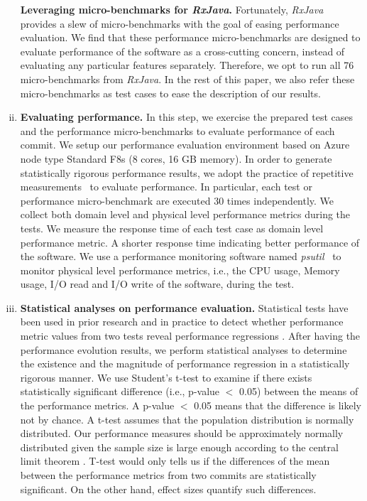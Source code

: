 \begin{enumerate}[(i)]
\noindent \textbf{Leveraging micro-benchmarks for \emph{RxJava}. }Fortunately, \emph{RxJava} provides a slew of micro-benchmarks with the goal of easing performance evaluation. We find that these performance micro-benchmarks are designed to evaluate performance of the software as a cross-cutting concern, instead of evaluating any particular features separately. Therefore, we opt to run all 76 micro-benchmarks from \emph{RxJava}. In the rest of this paper, we also refer these micro-benchmarks as test cases to ease the description of our results.

\item \textbf{Evaluating performance.}
In this step, we exercise the prepared test cases and the performance micro-benchmarks to evaluate performance of each commit. We setup our performance evaluation environment based on Azure node type Standard F8s (8 cores, 16 GB memory). In order to generate statistically rigorous performance results, we adopt the practice of repetitive measurements~\cite{peterfse} to evaluate performance. 
In particular, each test or performance micro-benchmark are executed 30 times independently. We collect both domain level and physical level performance metrics during the tests. We measure the response time of each test case as domain level performance metric. A shorter response time indicating better performance of the software. We use a performance monitoring software named \emph{psutil}~\cite{psutil} to monitor physical level performance metrics, i.e., the CPU usage, Memory usage, I/O read and I/O write of the software, during the test.

\item \textbf{Statistical analyses on performance evaluation.}
Statistical tests have been used in prior research and in practice to detect whether performance metric values from two tests reveal performance regressions \cite{AlGhmadi}. After having the performance evolution results, we perform statistical analyses to determine the existence and the magnitude of performance regression in a statistically rigorous manner. 
We use Student’s t-test to examine if there exists statistically significant difference (i.e., p-value $<$ 0.05) between the means of the performance metrics. A p-value $<$ 0.05 means that the difference is likely not by chance. 
A t-test assumes that the population distribution is normally distributed. Our performance measures should be approximately normally distributed given the sample size is large enough according to the central limit theorem \cite{Chen:2014}.
T-test would only tells us if the differences of the mean between the performance metrics from two commits are statistically significant. On the other hand, effect sizes quantify such differences. 


\end{enumerate}
